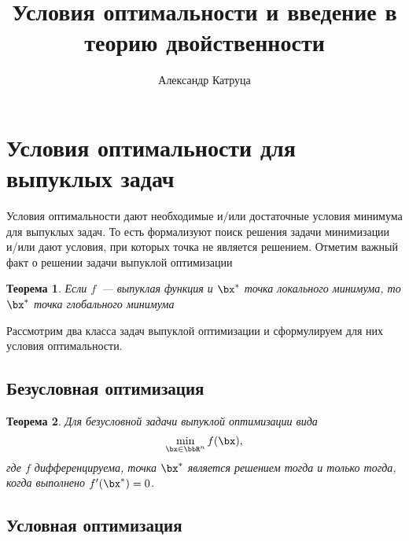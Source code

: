 \documentclass[12pt]{article}
\author{Александр Катруца}
\title{Условия оптимальности и введение в теорию двойственности}
\newtheorem{Th}{Теорема}
\begin{document}
\maketitle

\section{Условия оптимальности для выпуклых задач}

Условия оптимальности дают необходимые и/или достаточные условия минимума для выпуклых задач.
То есть формализуют поиск решения задачи минимизации и/или дают условия, при которых точка не является решением.
Отметим важный факт о решении задачи выпуклой оптимизации

\begin{Th}
Если $f$~--- выпуклая функция и $\bx^*$ точка локального минимума, то $\bx^*$ точка глобального минимума
\end{Th}

Рассмотрим два класса задач выпуклой оптимизации и сформулируем для них условия оптимальности.

\subsection{Безусловная оптимизация}

\begin{Th}
Для безусловной задачи выпуклой оптимизации вида 
\[
\min_{\bx \in \bbR^n} f(\bx),
\]
где $f$ дифференцируема, точка $\bx^*$ является решением тогда и только тогда, когда выполнено $f'(\bx^*) = 0$. 
\end{Th}

\subsection{Условная оптимизация} 
\end{document}
